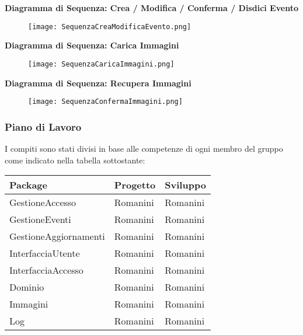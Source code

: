 \textbf{Diagramma di Sequenza: Crea / Modifica / Conferma / Disdici Evento}

\begin{figure}[h!]
    \begin{center}
        \texttt{[image: SequenzaCreaModificaEvento.png]}
    \end{center}
\end{figure}
\hfill \break
\clearpage
\textbf{Diagramma di Sequenza: Carica Immagini}

\begin{figure}[h!]
    \begin{center}
        \texttt{[image: SequenzaCaricaImmagini.png]}
    \end{center}
\end{figure}
\hfill \break

\textbf{Diagramma di Sequenza: Recupera Immagini}

\begin{figure}[h!]
    \begin{center}
        \texttt{[image: SequenzaConfermaImmagini.png]}
    \end{center}
\end{figure}
\hfill \break
\clearpage

\newpage

\subsubsection{Piano di Lavoro}

I compiti sono stati divisi in base alle competenze di
ogni membro del gruppo come indicato nella tabella sottostante:
\hfill \break

\begin{tabular} {|P{6cm}|P{4.5cm}|P{4.5cm}|}
    \hline
    \textbf{Package}      & \textbf{Progetto} & \textbf{Sviluppo} \\
    \hline
    GestioneAccesso       & Romanini          & Romanini          \\
    \hline
    GestioneEventi        & Romanini          & Romanini          \\
    \hline
    GestioneAggiornamenti & Romanini          & Romanini          \\
    \hline
    InterfacciaUtente     & Romanini          & Romanini          \\
    \hline
    InterfacciaAccesso    & Romanini          & Romanini          \\
    \hline
    Dominio               & Romanini          & Romanini          \\
    \hline
    Immagini              & Romanini          & Romanini          \\
    \hline
    Log                   & Romanini          & Romanini          \\
    \hline
\end{tabular}
\hfill \break

